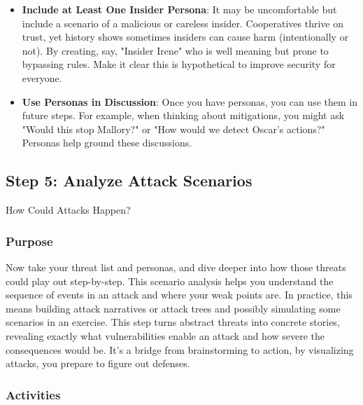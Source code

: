 \begin{itemize}
    \item \textbf{Include at Least One Insider Persona}: It may be uncomfortable but include a scenario of a malicious or
    careless insider. Cooperatives thrive on trust, yet history shows sometimes insiders can cause harm (intentionally
    or not). By creating, say, "Insider Irene" who is well meaning but prone to bypassing rules.
    Make it clear this is hypothetical to improve security for everyone.
    
    \item \textbf{Use Personas in Discussion}: Once you have personas, you can use them in future steps. For example, when
    thinking about mitigations, you might ask "Would this stop Mallory?" or "How would we detect Oscar's actions?"
    Personas help ground these discussions.
\end{itemize}

\subsection{Step 5: Analyze Attack Scenarios}
\label{subsec:Step5}

How Could Attacks Happen?

\subsubsection{Purpose}

Now take your threat list and personas, and dive deeper into how those threats
could play out step-by-step. This scenario analysis helps you understand the
sequence of events in an attack and where your weak points are. In practice,
this means building attack narratives or attack trees and possibly simulating
some scenarios in an exercise. This step turns abstract threats into
concrete stories, revealing exactly what vulnerabilities enable an attack and
how severe the consequences would be. It's a bridge from brainstorming to
action, by visualizing attacks, you prepare to figure out defenses.

\subsubsection{Activities}

